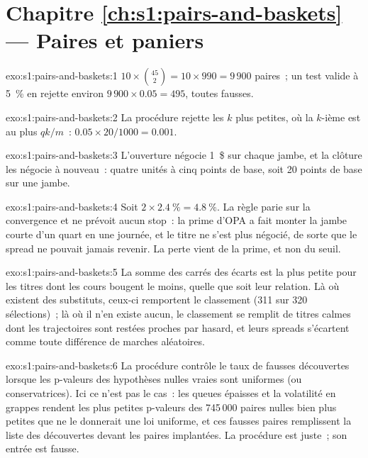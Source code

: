 \section*{Chapitre \ref{ch:s1:pairs-and-baskets} --- Paires et paniers}

\begin{solution}{exo:s1:pairs-and-baskets:1}
$10 \times \binom{45}{2} = 10 \times 990 = 9\,900$ paires~; un test valide à 5~\% en rejette environ $9\,900 \times 0.05 = 495$, toutes fausses.
\end{solution}

\begin{solution}{exo:s1:pairs-and-baskets:2}
La procédure rejette les $k$ plus petites, où la $k$-ième est au plus $qk/m$~: $0.05 \times 20/1000 = 0.001$.
\end{solution}

\begin{solution}{exo:s1:pairs-and-baskets:3}
L'ouverture négocie 1~\$ sur chaque jambe, et la clôture les négocie à nouveau~: quatre unités à cinq points de base, soit 20 points de base sur une jambe.
\end{solution}

\begin{solution}{exo:s1:pairs-and-baskets:4}
Soit $2 \times 2.4~\% = 4.8~\%$. La règle parie sur la convergence et ne prévoit aucun stop~: la prime d'OPA a fait monter la jambe courte d'un quart en une journée, et le titre
ne s'est plus négocié, de sorte que le spread ne pouvait jamais revenir. La perte vient de la prime, et non du seuil.
\end{solution}

\begin{solution}{exo:s1:pairs-and-baskets:5}
La somme des carrés des écarts est la plus petite pour les titres dont les cours bougent le moins, quelle que soit leur relation. Là où existent des substituts, ceux-ci remportent le classement (311
sur 320 sélections)~; là où il n'en existe aucun, le classement se remplit de titres calmes dont les trajectoires sont restées proches par hasard, et leurs spreads s'écartent comme toute
différence de marches aléatoires.
\end{solution}

\begin{solution}{exo:s1:pairs-and-baskets:6}
La procédure contrôle le taux de fausses découvertes lorsque les p-valeurs des hypothèses nulles vraies sont uniformes (ou conservatrices). Ici ce n'est pas le cas~: les queues épaisses et
la volatilité en grappes rendent les plus petites p-valeurs des 745\,000 paires nulles bien plus petites que ne le donnerait une loi uniforme, et ces fausses paires remplissent la
liste des découvertes devant les paires implantées. La procédure est juste~; son entrée est fausse.
\end{solution}


